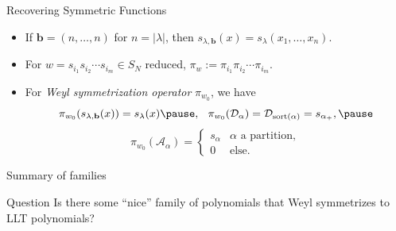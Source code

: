 \documentclass[dvipsnames]{beamer}
\DeclareMathOperator{\sort}{sort}
\newcommand{\Acal}{{\mathcal A}}
\newcommand{\Dcal}{{\mathcal D}}
\newcommand{\bb}{{\mathbf b}}
\theoremstyle{definition}
\newcounter{c}
\begin{document}
\begin{frame}{Recovering Symmetric Functions}
  \begin{itemize}
  \item If \(\bb = (n,\ldots,n)\) for \(n = |\lambda|\), then
    \(s_{\lambda,\bb}(x) = s_\lambda(x_1,\ldots,x_n)\).\pause
  \item For $w=s_{i_1}s_{i_2}\cdots s_{i_m} \in S_{N}$ reduced,
    $\pi_w := \pi_{i_1}\pi_{i_2}\cdots \pi_{i_m}.$\pause
  \item For \emph{Weyl symmetrization operator} \(\pi_{w_0}\), we
    have \pause \[
        \pi_{w_0}(s_{\lambda,\bb}(x)) = s_\lambda(x)\pause, \hspace{0.1in}
        \pi_{w_0}(\Dcal_\alpha) = \Dcal_{\sort(\alpha)} = s_{\alpha_+},\pause
      \]
      \[
        \pi_{w_0}(\Acal_\alpha) =
        \begin{cases}
          s_\alpha & \alpha \text{ a partition},\\
          0 & \text{else.}
        \end{cases}
    \]
  \end{itemize}
\end{frame}
\begin{frame}{Summary of families}
   \begin{center}
    \pause
    \begin{block}{Question}
      Is there some ``nice'' family of polynomials that Weyl
      symmetrizes to LLT polynomials?
    \end{block}
  \end{center}
\end{frame}
\end{document}
